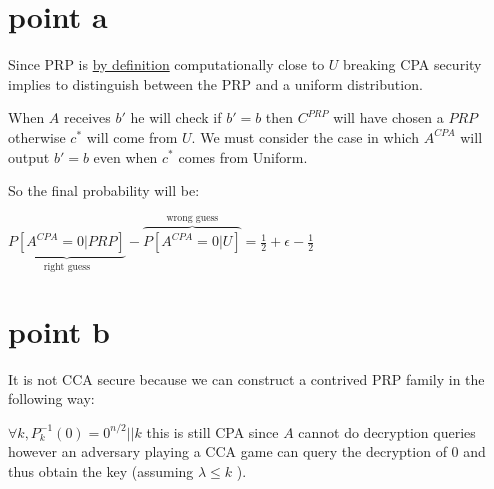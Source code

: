 \section{point a}

Since PRP is \underline{by definition} computationally close to $U$ breaking CPA security implies to distinguish between the PRP and a uniform distribution.

\begin{figure}[h!]
    \centering
    \sdinit{}
\end{figure}

When $A$ receives $b'$ he will check if $b'=b$ then $C^{PRP}$ will have chosen a $PRP$ otherwise $c^*$ will come from $U$. We must consider the case in which $A^{CPA}$ will output $b'=b$ even when $c^*$ comes from Uniform. 

So the final probability will be:

$ \underbrace{P[A^{CPA}=0 | PRP]}_{\text{right guess}} - \overbrace{P[A^{CPA}=0 | U]}^{\text{wrong guess}} = \frac{1}{2}+\epsilon - \frac{1}{2}$

\section{point b}

It is not CCA secure because we can construct a contrived PRP family in the following way:

$\forall k, P_k^{-1}(0) = 0^{n/2} || k$ this is still CPA since $A$ cannot do decryption queries however an adversary  playing a CCA game can query the decryption of $0$ and thus obtain the key (assuming $\lambda \leq k$ ).